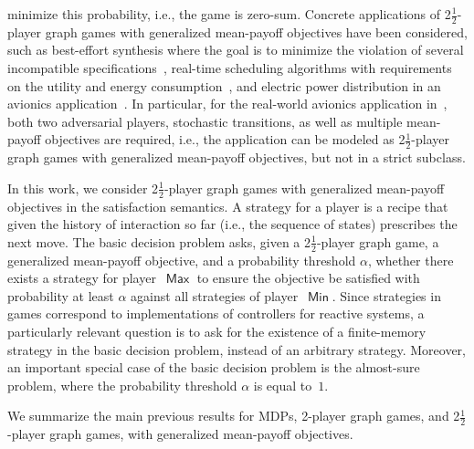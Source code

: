 \documentclass{article}
\newcommand{\half}{$\frac{\text{1}}{\text{2}}$}
\DeclareMathOperator{\ma}{\mathsf{Max}}
\DeclareMathOperator{\mi}{\mathsf{Min}}
\begin{document}
minimize this probability, i.e., the game is zero-sum.
Concrete applications of 2\half-player graph games with generalized mean-payoff objectives have been considered, such as 
best-effort synthesis where the goal is to minimize the violation 
of several incompatible specifications~\cite{CGHRT12}, real-time
scheduling algorithms with requirements on the utility and energy consumption~\cite{CPKS14},
and electric power distribution in an avionics application~\cite{BKTW15}.
In particular, for the real-world avionics application in~\cite{BKTW15},
both two adversarial players, stochastic transitions, as well as multiple mean-payoff
objectives are required, i.e., the application can be modeled as 2\half-player
graph games with generalized mean-payoff objectives, but not in a strict subclass.




\smallskip{} 
In this work, we consider 2\half-player graph games with generalized 
mean-payoff objectives in the satisfaction semantics.
A strategy for a player is a recipe that given the history of interaction so far 
(i.e., the sequence of states) prescribes the next move.
The basic decision problem asks, given a 2\half-player graph 
game, a generalized mean-payoff objective, and a probability threshold 
$\alpha$, whether there exists a strategy for player~$\ma$ to ensure the objective 
be satisfied with probability at least $\alpha$ against all strategies of 
player~$\mi$. 
Since strategies in games correspond to implementations of controllers for 
reactive systems, a particularly relevant question is to ask for the existence 
of a finite-memory strategy in the basic decision problem, instead of an 
arbitrary strategy.
Moreover, an important special case of the basic decision problem is the 
almost-sure problem, where the probability threshold $\alpha$ is equal to~$1$.


\smallskip{}
We summarize the main previous results for MDPs, 2-player graph games, and 
2\half-player graph games, with generalized mean-payoff objectives.
\end{document}
